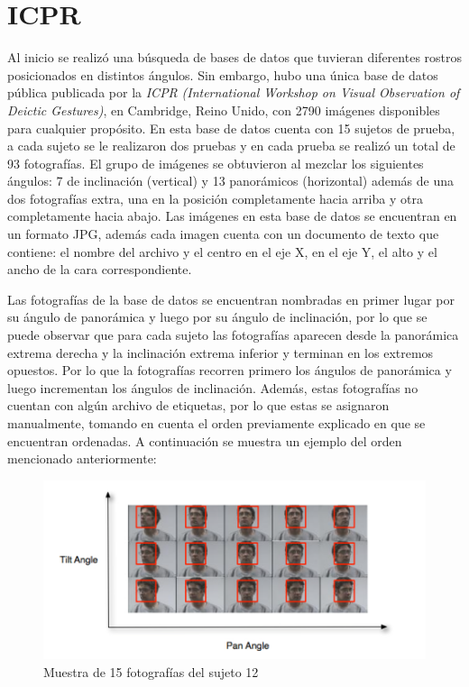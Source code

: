\section{ICPR}

Al inicio se realizó una búsqueda de bases de datos que tuvieran diferentes rostros posicionados en distintos ángulos. Sin embargo, hubo una única base de datos pública publicada por la \textit{ICPR} \textit{(International Workshop on Visual Observation of Deictic Gestures)}, en Cambridge, Reino Unido, con  2790 imágenes disponibles para cualquier propósito. En esta base de datos cuenta con 15 sujetos de prueba, a cada sujeto se le realizaron dos pruebas y en cada prueba se realizó un total de 93 fotografías. El grupo de imágenes se obtuvieron al mezclar los siguientes ángulos: 7 de inclinación (vertical) y 13 panorámicos (horizontal) además de una dos fotografías extra, una en la posición completamente hacia arriba y otra completamente hacia abajo. Las imágenes en esta base de datos se encuentran en un formato JPG, además cada imagen cuenta con un documento de texto que contiene: el nombre del archivo y el centro en el eje X, en el eje Y, el alto y el ancho de la cara correspondiente. \cite{Gourier_Hall_Crowley}

Las fotografías de la base de datos se encuentran nombradas en primer lugar por su ángulo de panorámica y luego por su ángulo de inclinación, por lo que se puede observar que para cada sujeto las fotografías aparecen desde la panorámica extrema derecha y la inclinación extrema inferior y terminan en los extremos opuestos. Por lo que la fotografías recorren primero los ángulos de panorámica y luego incrementan los ángulos de inclinación. Además, estas fotografías no cuentan con algún archivo de etiquetas, por lo que estas se asignaron manualmente, tomando en cuenta el orden previamente explicado en que se encuentran ordenadas. A continuación se muestra un ejemplo del orden mencionado anteriormente:

\begin{figure}[H]
	\centering
	\includegraphics[scale=1]{figures/tiltpan.png}
	\caption{Muestra de 15 fotografías del sujeto 12 \cite{Gourier_Hall_Crowley}}
	\label{fig:img1}
\end{figure}

